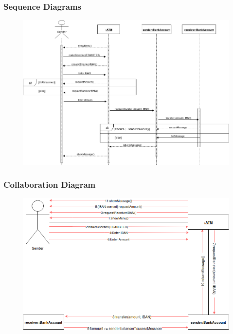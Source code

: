 \documentclass{article}
\begin{document}
		\newpage\subsubsection{Sequence Diagrams}
		\begin{figure}[h!]
		  \includegraphics[width=\linewidth]{img/transfer_sequence.png}
		\end{figure}

		\newpage\subsubsection{Collaboration Diagram}	
		\begin{figure}[h!]
		  \includegraphics[width=\linewidth]{img/transfer_collaboration.png}
		\end{figure}
\end{document}
